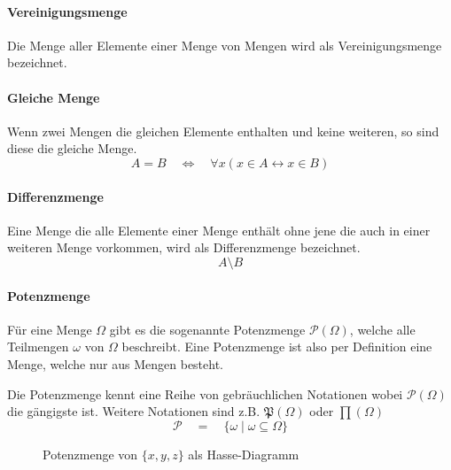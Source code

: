 \paragraph{Vereinigungsmenge} Die Menge aller Elemente einer Menge
von Mengen wird als \gls{Vereinigungsmenge} bezeichnet.

\paragraph{Gleiche Menge} Wenn zwei Mengen die gleichen Elemente
enthalten und keine weiteren, so sind diese die \gls{gleiche Menge}.
\[  
	A = B 
	\quad \Leftrightarrow \quad 
	\forall x (x \in A \leftrightarrow x \in B)
\]

\paragraph{Differenzmenge}
Eine Menge die alle Elemente einer Menge enthält ohne jene die auch
in einer weiteren Menge vorkommen, wird als \gls{Differenzmenge} 
bezeichnet.
\[
	A \setminus B 
\]

\paragraph{Potenzmenge}
Für eine Menge $\Omega$ gibt es die sogenannte \gls{Potenzmenge} 
$\mathcal{P}(\Omega)$, welche alle Teilmengen $\omega$ von $\Omega$ 
beschreibt.
Eine Potenzmenge ist also per Definition eine Menge, welche nur
aus Mengen besteht. 

Die Potenzmenge kennt eine Reihe von gebräuchlichen
Notationen wobei $\mathcal{P}(\Omega)$ die gängigste ist. Weitere 
Notationen sind z.B. $\mathfrak{P}(\Omega)$ oder $\prod(\Omega)$
\[ 
	\mathcal{P} 
		\quad = \quad \{\omega \mid \omega \subseteq \Omega \}
\]

\begin{figure}[h!]
	\centering
	\caption{Potenzmenge von $\{x,y,z\}$ als Hasse-Diagramm}
\end{figure}

